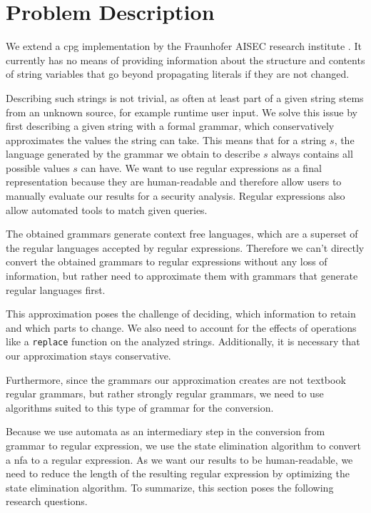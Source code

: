 \chapter{Problem Description}
\label{chapter:ProblemDescription}

We extend a \ac{cpg} implementation by the Fraunhofer AISEC research institute \cite{cpg}. It currently has no means of providing information about the structure and contents of string variables that go beyond propagating literals if they are not changed.

Describing such strings is not trivial, as often at least part of a given string stems from an unknown source, for example runtime user input.
We solve this issue by first describing a given string with a formal grammar, which conservatively approximates the values the string can take.
This means that for a string $s$, the language generated by the grammar we obtain to describe $s$ always contains all possible values $s$ can have.
We want to use regular expressions as a final representation because they are human-readable and therefore allow users to manually evaluate our results for a security analysis. Regular expressions also allow automated tools to match given queries. 

The obtained grammars generate context free languages, which are a superset of the regular languages accepted by regular expressions. Therefore we can't directly convert the obtained grammars to regular expressions without any loss of information, but rather need to approximate them with grammars that generate regular languages first.

This approximation poses the challenge of deciding, which information to retain and which parts to change. We also need to account for the effects of operations like a \lstinline|replace| function on the analyzed strings. Additionally, it is necessary that our approximation stays conservative.

Furthermore, since the grammars our approximation creates are not textbook regular grammars, but rather strongly regular grammars, we need to use algorithms suited to this type of grammar for the conversion.

Because we use automata as an intermediary step in the conversion from grammar to regular expression, we use the state elimination algorithm \cite{brzozowksi_mccluskey} to convert a \ac{nfa} to a regular expression. As we want our results to be human-readable, we need to reduce the length of the resulting regular expression by optimizing the state elimination algorithm.
\clearpage
To summarize, this section poses the following research questions.


